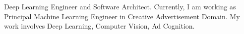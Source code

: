 \par{
	Deep  Learning Engineer and Software Architect. Currently, I am working as Principal Machine Learning Engineer in Creative Advertisement Domain. My work involves Deep Learning, Computer Vision, Ad Cognition. 
}